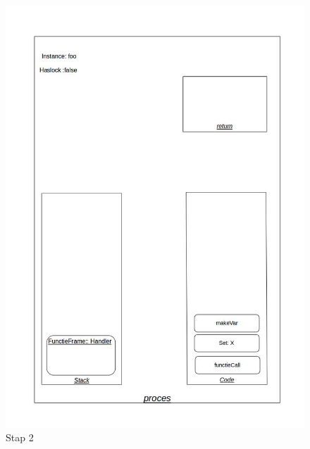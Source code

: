 \documentclass[]{article}
\begin{document}
\begin{figure}[H]
\centering
\includegraphics[scale=0.4]{AnalyseADTAlgorithm/processtappen/stap2.jpg}
\caption{Stap 2}
\end{figure}
\end{document}
